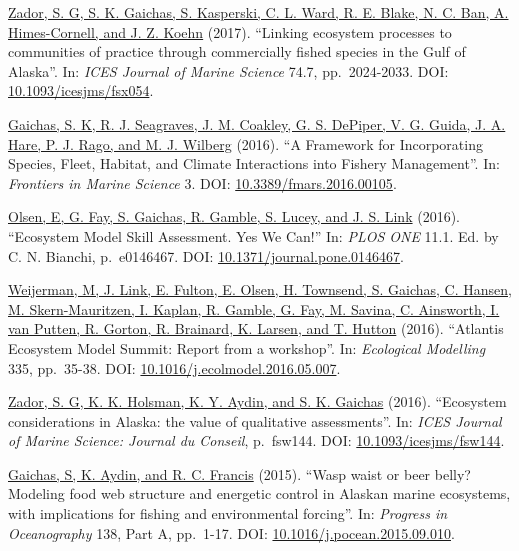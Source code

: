 \documentclass[11pt, a4paper]{awesome-cv}
\begin{document}
\protect\hyperlink{cite-zador_linking_2017}{Zador, S. G, S. K. Gaichas, S.
Kasperski, C. L. Ward, R. E. Blake, N. C. Ban, A. Himes-Cornell, and J.
Z. Koehn} (2017). ``Linking ecosystem
processes to communities of practice through commercially fished
species in the Gulf of Alaska''. In: \emph{ICES Journal of Marine Science}
74.7, pp.~2024-2033. DOI:
\href{https://doi.org/10.1093\%2Ficesjms\%2Ffsx054}{10.1093/icesjms/fsx054}.

\protect\hyperlink{cite-gaichas_framework_2016}{Gaichas, S. K, R. J. Seagraves,
J. M. Coakley, G. S. DePiper, V. G. Guida, J. A. Hare, P. J. Rago, and
M. J. Wilberg} (2016). ``A Framework for
Incorporating Species, Fleet, Habitat, and Climate Interactions into
Fishery Management''. In: \emph{Frontiers in Marine Science} 3. DOI:
\href{https://doi.org/10.3389\%2Ffmars.2016.00105}{10.3389/fmars.2016.00105}.

\protect\hyperlink{cite-olsen_ecosystem_2016}{Olsen, E, G. Fay, S. Gaichas, R.
Gamble, S. Lucey, and J. S. Link} (2016).
``Ecosystem Model Skill Assessment. Yes We Can!'' In: \emph{PLOS ONE} 11.1.
Ed. by C. N. Bianchi, p.~e0146467. DOI:
\href{https://doi.org/10.1371\%2Fjournal.pone.0146467}{10.1371/journal.pone.0146467}.

\protect\hyperlink{cite-weijerman_atlantis_2016}{Weijerman, M, J. Link, E.
Fulton, E. Olsen, H. Townsend, S. Gaichas, C. Hansen, M.
Skern-Mauritzen, I. Kaplan, R. Gamble, G. Fay, M. Savina, C. Ainsworth,
I. van Putten, R. Gorton, R. Brainard, K. Larsen, and T.
Hutton} (2016). ``Atlantis Ecosystem
Model Summit: Report from a workshop''. In: \emph{Ecological Modelling} 335,
pp.~35-38. DOI:
\href{https://doi.org/10.1016\%2Fj.ecolmodel.2016.05.007}{10.1016/j.ecolmodel.2016.05.007}.

\protect\hyperlink{cite-zador_ecosystem_2016}{Zador, S. G, K. K. Holsman, K. Y.
Aydin, and S. K. Gaichas} (2016).
``Ecosystem considerations in Alaska: the value of qualitative
assessments''. In: \emph{ICES Journal of Marine Science: Journal du Conseil},
p.~fsw144. DOI:
\href{https://doi.org/10.1093\%2Ficesjms\%2Ffsw144}{10.1093/icesjms/fsw144}.

\protect\hyperlink{cite-gaichas_wasp_2015}{Gaichas, S, K. Aydin, and R. C.
Francis} (2015). ``Wasp waist or beer belly?
Modeling food web structure and energetic control in Alaskan marine
ecosystems, with implications for fishing and environmental forcing''.
In: \emph{Progress in Oceanography} 138, Part A, pp.~1-17. DOI:
\href{https://doi.org/10.1016\%2Fj.pocean.2015.09.010}{10.1016/j.pocean.2015.09.010}.
\end{document}
